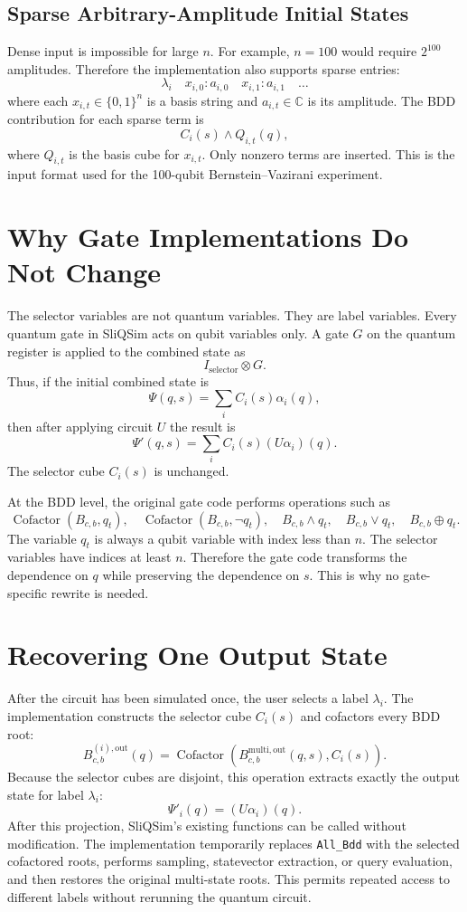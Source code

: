 \documentclass[sigconf,nonacm]{acmart}
\begin{document}
\subsection{Sparse Arbitrary-Amplitude Initial States}
Dense input is impossible for large $n$. For example, $n=100$ would require $2^{100}$ amplitudes. Therefore the implementation also supports sparse entries:
\[
  \lambda_i\quad x_{i,0}:a_{i,0}\quad x_{i,1}:a_{i,1}\quad \ldots
\]
where each $x_{i,t}\in\{0,1\}^n$ is a basis string and $a_{i,t}\in\mathbb{C}$ is its amplitude. The BDD contribution for each sparse term is
\[
  C_i(s)\wedge Q_{i,t}(q),
\]
where $Q_{i,t}$ is the basis cube for $x_{i,t}$. Only nonzero terms are inserted. This is the input format used for the 100-qubit Bernstein--Vazirani experiment.

\section{Why Gate Implementations Do Not Change}
The selector variables are not quantum variables. They are label variables. Every quantum gate in SliQSim acts on qubit variables only. A gate $G$ on the quantum register is applied to the combined state as
\[
  I_{\mathrm{selector}}\otimes G.
\]
Thus, if the initial combined state is
\[
  \Psi(q,s)=\sum_i C_i(s)\alpha_i(q),
\]
then after applying circuit $U$ the result is
\[
  \Psi'(q,s)
  =
  \sum_i C_i(s)(U\alpha_i)(q).
\]
The selector cube $C_i(s)$ is unchanged.

At the BDD level, the original gate code performs operations such as
\[
  \operatorname{Cofactor}(B_{c,b},q_t),
  \quad
  \operatorname{Cofactor}(B_{c,b},\neg q_t),
  \quad
  B_{c,b}\wedge q_t,
  \quad
  B_{c,b}\vee q_t,
  \quad
  B_{c,b}\oplus q_t.
\]
The variable $q_t$ is always a qubit variable with index less than $n$. The selector variables have indices at least $n$. Therefore the gate code transforms the dependence on $q$ while preserving the dependence on $s$. This is why no gate-specific rewrite is needed.

\section{Recovering One Output State}
After the circuit has been simulated once, the user selects a label $\lambda_i$. The implementation constructs the selector cube $C_i(s)$ and cofactors every BDD root:
\[
  B^{(i),\mathrm{out}}_{c,b}(q)
  =
  \operatorname{Cofactor}\left(B^{\mathrm{multi,out}}_{c,b}(q,s), C_i(s)\right).
\]
Because the selector cubes are disjoint, this operation extracts exactly the output state for label $\lambda_i$:
\[
  \Psi'_i(q)=(U\alpha_i)(q).
\]
After this projection, SliQSim's existing functions can be called without modification. The implementation temporarily replaces \texttt{All\_Bdd} with the selected cofactored roots, performs sampling, statevector extraction, or query evaluation, and then restores the original multi-state roots. This permits repeated access to different labels without rerunning the quantum circuit.
\end{document}
